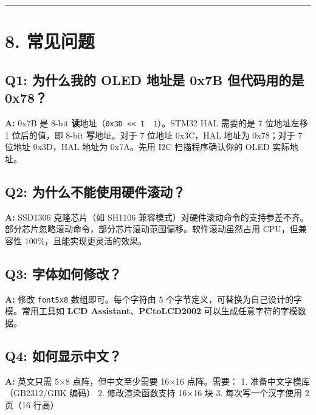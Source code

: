 \documentclass[
  chinese,
  UTF8,
  oneside,
  openany]{ctexbook}
\begin{document}
\begin{center}\rule{0.5\linewidth}{0.5pt}\end{center}

\section{8. 常见问题}\label{ux5e38ux89c1ux95eeux9898-2}

\subsection{Q1: 为什么我的 OLED 地址是 0x7B 但代码用的是
0x78？}\label{q1-ux4e3aux4ec0ux4e48ux6211ux7684-oled-ux5730ux5740ux662f-0x7b-ux4f46ux4ee3ux7801ux7528ux7684ux662f-0x78}

\textbf{A:} 0x7B 是 8-bit
\textbf{读}地址（\texttt{0x3D\ \textless{}\textless{}\ 1\ \textbar{}\ 1}）。STM32
HAL 需要的是 7 位地址左移 1 位后的值，即 8-bit \textbf{写}地址。对于 7
位地址 0x3C，HAL 地址为 0x78；对于 7 位地址 0x3D，HAL 地址为 0x7A。先用
I2C 扫描程序确认你的 OLED 实际地址。

\subsection{Q2:
为什么不能使用硬件滚动？}\label{q2-ux4e3aux4ec0ux4e48ux4e0dux80fdux4f7fux7528ux786cux4ef6ux6edaux52a8}

\textbf{A:} SSD1306 克隆芯片（如 SH1106
兼容模式）对硬件滚动命令的支持参差不齐。部分芯片忽略滚动命令，部分芯片滚动范围偏移。软件滚动虽然占用
CPU，但兼容性 100\%，且能实现更灵活的效果。

\subsection{Q3:
字体如何修改？}\label{q3-ux5b57ux4f53ux5982ux4f55ux4feeux6539}

\textbf{A:} 修改 \texttt{font5x8} 数组即可。每个字符由 5
个字节定义，可替换为自己设计的字模。常用工具如 \textbf{LCD
Assistant}、\textbf{PCtoLCD2002} 可以生成任意字符的字模数据。

\subsection{Q4:
如何显示中文？}\label{q4-ux5982ux4f55ux663eux793aux4e2dux6587}

\textbf{A:} 英文只需 5×8 点阵，但中文至少需要 16×16 点阵。需要： 1.
准备中文字模库（GB2312/GBK 编码） 2. 修改渲染函数支持 16×16 块 3.
每次写一个汉字使用 2 页（16 行高）
\end{document}
